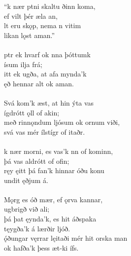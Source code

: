 \bva “k nær ptni \hld skaltu ðinn koma, \\%
\ind ef vilt þér æla an, \\%
lt eru skǫp, \hld nema n vitim \\%
\ind {}likan lǫst aman.”\\%

 \\

\bva {}ptr ek hvarf \hld ok nna þóttumk \\%
\ind {}ísum ilja frá; \\%
itt ek ugða, \hld at afa mynda'k \\%
\ind {}ęð hennar alt ok aman.\\%

 \\

\bva Svá kom'k æst, \hld at hin ýta vas \\%
\ind {}ígdrótt ǫll of akin; \\%
með rinnǫndum ljósum \hld ok ornum viði, \\%
\ind svá vas mér ílstígr of itaðr.\\%

 \\

\bva {}k nær morni, \hld es vas'k nn of kominn, \\%
\ind þá vas aldrótt of ofin; \\%
ręy ęitt þá fan'k \hld hinnar óðu konu \\%
\ind {}undit ęðjum á.\\%

 \\

\bva Mǫrg es óð mær, \hld ef ǫrva kannar, \\%
\ind {}ugbrigð við ali; \\%
þá þat ęynda'k, \hld es hit áðspaka \\%
\ind tęygða'k á lærðir ljóð. \\%
ǫ́ðungar vęrrar \hld lęitaði mér hit orska man \\%
\ind ok hafða'k þess æt-ki ífs.\\%

